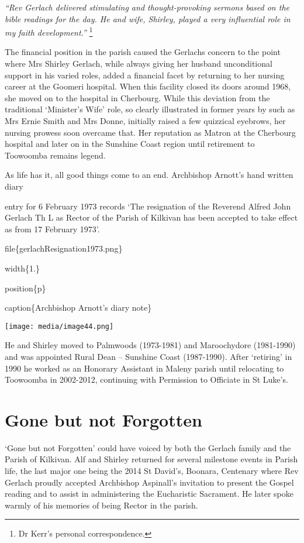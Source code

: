 \emph{``Rev Gerlach delivered stimulating and thought-provoking sermons based on the bible readings for the day. He and wife, Shirley, played a very influential role in my faith development.''} \footnote{Dr Kerr's personal correspondence.}

The financial position in the parish caused the Gerlachs concern to the point where Mrs Shirley Gerlach, while always giving her husband unconditional support in his varied roles, added a financial facet by returning to her nursing career at the Goomeri hospital. When this facility closed its doors around 1968, she moved on to the hospital in Cherbourg. While this deviation from the traditional `Minister's Wife' role, so clearly illustrated in former years by such as Mrs Ernie Smith and Mrs Donne, initially raised a few quizzical eyebrows, her nursing prowess soon overcame that. Her reputation as Matron at the Cherbourg hospital and later on in the Sunshine Coast region until retirement to Toowoomba remains legend.

As life has it, all good things come to an end. Archbishop Arnott's hand written diary

entry for 6 February 1973 records `The resignation of the Reverend Alfred John Gerlach Th L as Rector of the Parish of Kilkivan has been accepted to take effect as from 17 February 1973'.

file\{gerlachResignation1973.png\}

width\{1.\}

position\{p\}

caption\{Archbishop Arnott's diary note\}

\texttt{[image: media/image44.png]}

He and Shirley moved to Palmwoods (1973-1981) and Maroochydore (1981-1990) and was appointed Rural Dean -- Sunshine Coast (1987-1990). After `retiring' in 1990 he worked as an Honorary Assistant in Maleny parish until relocating to Toowoomba in 2002-2012, continuing with Permission to Officiate in St Luke's.

\hypertarget{gone-but-not-forgotten}{%
\section{Gone but not Forgotten}\label{gone-but-not-forgotten}}

`Gone but not Forgotten' could have voiced by both the Gerlach family and the Parish of Kilkivan. Alf and Shirley returned for several milestone events in Parish life, the last major one being the 2014 St David's, Boonara, Centenary where Rev Gerlach proudly accepted Archbishop Aspinall's invitation to present the Gospel reading and to assist in administering the Eucharistic Sacrament. He later spoke warmly of his memories of being Rector in the parish.

